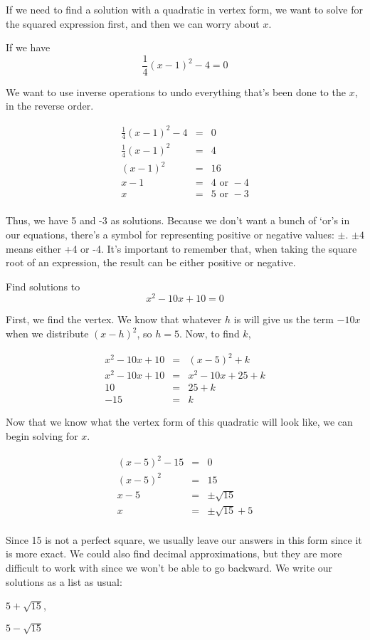 If we need to find a solution with a quadratic in vertex form, we want to solve for the squared expression first, and then we can worry about $x$.

If we have
$$\frac{1}{4}(x - 1)^2 - 4 = 0$$

We want to use inverse operations to undo everything that's been done to the $x$, in the reverse order.

$$\begin{array}{rcl}
\frac{1}{4}(x - 1)^2 - 4 & =& 0\\
\frac{1}{4}(x - 1)^2 & =& 4 \\
(x - 1)^2 & =& 16 \\
x - 1 & =& 4 \text{ or } -4\\
x & = & 5 \text{ or } -3\\
\end{array}$$

Thus, we have 5 and -3 as solutions.  Because we don't want a bunch of `or's in our equations, there's a symbol for representing positive or negative values: $\pm$.  $\pm4$ means either +4 or -4.  It's important to remember that, when taking the square root of an expression, the result can be either positive or negative.

\begin{example}
Find solutions to
$$x^2 - 10x + 10 = 0$$

First, we find the vertex.  We know that whatever $h$ is will give us the term $-10x$ when we distribute $(x - h)^2$, so $h = 5$.  Now, to find $k$, 

$$\begin{array}{rcl}
x^2 - 10x + 10  & = & (x - 5)^2 + k\\
x^2 - 10x + 10  & = & x^2 - 10x + 25 + k \\ 
10  & = & 25 + k \\ 
-15  & = & k
\end{array}$$

Now that we know what the vertex form of this quadratic will look like, we can begin solving for $x$.

$$\begin{array}{rcl}
(x - 5)^2 - 15 & = & 0 \\
(x - 5)^2 & = & 15 \\
x - 5 & = & \pm \sqrt{15} \\
x & = & \pm \sqrt{15} + 5\\
\end{array}$$

Since 15 is not a perfect square, we usually leave our answers in this form since it is more exact.  We could also find decimal approximations, but they are more difficult to work with since we won't be able to go backward.  We write our solutions as a list as usual:

$5 + \sqrt{15}$, 

$5 - \sqrt{15}$

\end{example}